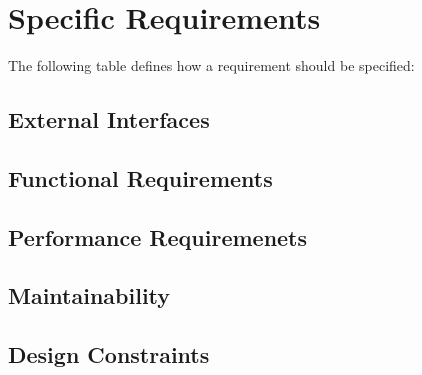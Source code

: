 \section{Specific Requirements}
The following table defines how a requirement should be specified:

\subsection{External Interfaces}
\subsection{Functional Requirements}




\subsection{Performance Requiremenets}
\subsection{Maintainability}
\subsection{Design Constraints}







